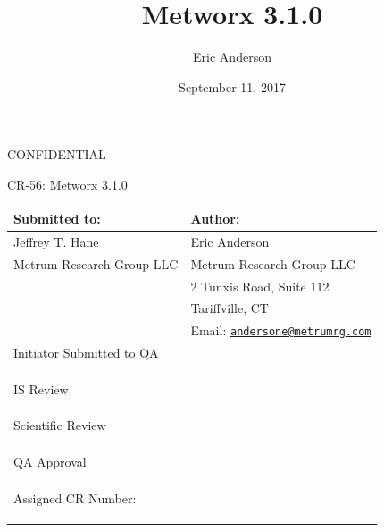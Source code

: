 \documentclass[]{article}
\title{Metworx 3.1.0}
\author{Eric Anderson}
\date{September 11, 2017}
\begin{document}
\setlength{\parindent}{0pt}


\vspace*{1cm}
\begin{center}
{\large CONFIDENTIAL}


\vspace*{1cm}


\vspace*{1cm}

{\huge CR-56: Metworx 3.1.0}
\vspace{3.0cm}

\begin{tabular}{|p{7cm}|p{7cm}|}\hline
Submitted to: & Author:\\\hline
Jeffrey T. Hane & Eric Anderson \\
Metrum Research Group LLC & Metrum Research Group LLC\\
  & 2 Tunxis Road, Suite 112\\
  & Tariffville, CT\\
  & Email: \href{mailto:andersone@metrumrg.com}{\nolinkurl{andersone@metrumrg.com}}  \\\hline

  Initiator Submitted to QA   & \\

  & \\
  & \\
  & \\\hline

  IS Review   & \\

  & \\
  & \\
  & \\\hline
  
  Scientific Review   & \\

  & \\
  & \\
  & \\\hline


QA Approval  & \\

 & \\
 & \\
 & \\\hline

 Assigned CR Number: & \\

 & \\
 & \\
 & \\\hline


\end{tabular}

\end{center}
\end{document}
